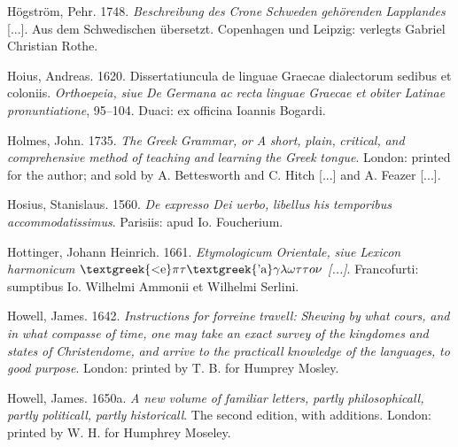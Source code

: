 \documentclass[output=paper]{langsci/langscibook}
\begin{document}
Högström, Pehr. 1748. \textit{Beschreibung} \textit{des} \textit{Crone} \textit{Schweden} \textit{gehörenden} \textit{Lapplandes} [...]. Aus dem Schwedischen übersetzt. Copenhagen und Leipzig: verlegts Gabriel Christian Rothe.

Hoius, Andreas. 1620. Dissertatiuncula de linguae Graecae dialectorum sedibus et coloniis. \textit{Orthoepeia,} \textit{siue} \textit{De} \textit{Germana} \textit{ac} \textit{recta} \textit{linguae} \textit{Graecae} \textit{et} \textit{obiter} \textit{Latinae} \textit{pronuntiatione}, 95–104. Duaci: ex officina Ioannis Bogardi.

Holmes, John. 1735. \textit{The} \textit{Greek} \textit{Grammar,} \textit{or} \textit{A} \textit{short,} \textit{plain,} \textit{critical,} \textit{and} \textit{comprehensive} \textit{method} \textit{of} \textit{teaching} \textit{and} \textit{learning} \textit{the} \textit{Greek} \textit{tongue}. London: printed for the author; and sold by A. Bettesworth and C. Hitch [...] and A. Feazer [...].

Hosius, Stanislaus. 1560. \textit{De} \textit{expresso} \textit{Dei} \textit{uerbo,} \textit{libellus} \textit{his} \textit{temporibus} \textit{accommodatissimus}. Parisiis: apud Io. Foucherium.

Hottinger, Johann Heinrich. 1661. \textit{Etymologicum} \textit{Orientale,} \textit{siue} \textit{Lexicon} \textit{harmonicum} \textit{$\text{\textgreek{<e}}\pi \tau \text{\textgreek{'a}}\gamma \lambda \omega \tau \tau o\nu $ [...]}. Francofurti: sumptibus Io. Wilhelmi Ammonii et Wilhelmi Serlini.

Howell, James. 1642. \textit{Instructions} \textit{for} \textit{forreine} \textit{travell:} \textit{Shewing} \textit{by} \textit{what} \textit{cours,} \textit{and} \textit{in} \textit{what} \textit{compasse} \textit{of} \textit{time,} \textit{one} \textit{may} \textit{take} \textit{an} \textit{exact} \textit{survey} \textit{of} \textit{the} \textit{kingdomes} \textit{and} \textit{states} \textit{of} \textit{Christendome,} \textit{and} \textit{arrive} \textit{to} \textit{the} \textit{practicall} \textit{knowledge} \textit{of} \textit{the} \textit{languages,} \textit{to} \textit{good} \textit{purpose}. London: printed by T. B. for Humprey Mosley.

Howell, James. 1650a. \textit{A} \textit{new} \textit{volume} \textit{of} \textit{familiar} \textit{letters,} \textit{partly} \textit{philosophicall,} \textit{partly} \textit{politicall,} \textit{partly} \textit{historicall}. The second edition, with additions. London: printed by W. H. for Humphrey Moseley.
\end{document}

